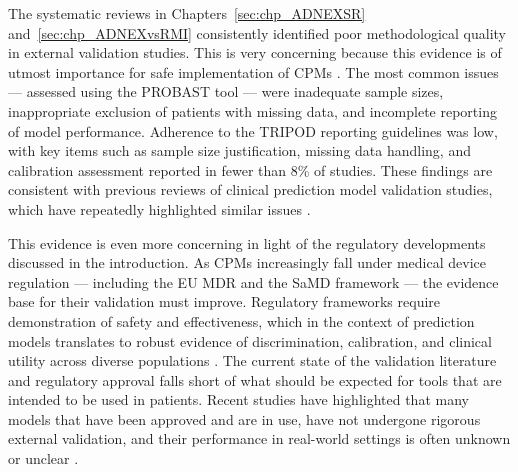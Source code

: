 The systematic reviews in Chapters~\ref{sec:chp_ADNEXSR} and~\ref{sec:chp_ADNEXvsRMI} consistently identified poor methodological quality in external validation studies. This is very concerning because this evidence is of utmost importance for safe implementation of \glspl{CPM} \cite{steyerbergPredictionModelsNeed2016}.  The most common issues --- assessed using the \gls{PROBAST} tool \cite{wolffPROBASTToolAssess2019} --- were inadequate sample sizes, inappropriate exclusion of patients with missing data, and incomplete reporting of model performance. Adherence to the \gls{TRIPOD} reporting guidelines \cite{collinsTRIPODAIStatementUpdated2024} was low, with key items such as sample size justification, missing data handling, and calibration assessment reported in fewer than 8\% of studies. These findings are consistent with previous reviews of clinical prediction model validation studies, which have repeatedly highlighted similar issues \cite{collinsExternalValidationMultivariable2014, bouwmeesterReportingMethodsClinical2012, andaurnavarroCompletenessReportingClinical2022,andaurnavarroSystematicReviewFinds2023, andaurnavarroSystematicReviewIdentifies2023, dhimanMethodologicalConductPrognostic2022, dhimanOverinterpretationFindingsMachine2023}.

This evidence is even more concerning in light of the regulatory developments discussed in the introduction. As \glspl{CPM} increasingly fall under medical device regulation --- including the EU \gls{MDR} and the \gls{SaMD} framework --- the evidence base for their validation must improve. Regulatory frameworks require demonstration of safety and effectiveness, which in the context of prediction models translates to robust evidence of discrimination, calibration, and clinical utility across diverse populations \cite{vancalsterPerformanceEvaluationPredictive2024, collinsTRIPODAIStatementUpdated2024}. The current state of the validation literature and regulatory approval falls short of what should be expected for tools that are intended to be used in patients. Recent studies have highlighted that many models that have been approved and are in use, have not undergone rigorous external validation, and their performance in real-world settings is often unknown or unclear \cite{mehtaEvaluatingTransparencyAI2025,vanleeuwenArtificialIntelligenceRadiology2021}.

